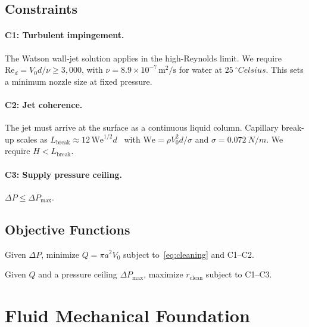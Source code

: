 \documentclass[10pt,letterpaper]{article}
\newcommand{\Rey}{\mathrm{Re}}
\newcommand{\We}{\mathrm{We}}
\begin{document}
\subsection{Constraints}

\paragraph{C1: Turbulent impingement.}
The Watson wall-jet solution applies in the high-Reynolds limit. We require
$\Rey_d = V_0 d/\nu \geq 3{,}000$, with $\nu = 8.9\times 10^{-7}\,\mathrm{m^2/s}$
for water at $25~^\circ Celsius$. This sets a minimum nozzle size at
fixed pressure.

\paragraph{C2: Jet coherence.}
The jet must arrive at the surface as a continuous liquid column. Capillary
break-up scales as $L_\mathrm{break} \approx 12\,\We^{1/2} d$~\citep{Lefebvre1988}
with $\We = \rho V_0^2 d/\sigma$ and $\sigma = 0.072~N/m$. We require
$H < L_\mathrm{break}$.

\paragraph{C3: Supply pressure ceiling.}
$\Delta P \leq \Delta P_\mathrm{max}$.

\subsection{Objective Functions}

\begin{description}[leftmargin=10pt]
\item[P1 (water minimization, fixed $\Delta P$):]
Given $\Delta P$, minimize $Q = \pi a^2 V_0$ subject to~\eqref{eq:cleaning}
and C1--C2.
\item[P2 (coverage maximization, fixed $Q$):]
Given $Q$ and a pressure ceiling $\Delta P_\mathrm{max}$, maximize
$r_\mathrm{clean}$ subject to C1--C3.
\end{description}

\section{Fluid Mechanical Foundation}
\label{sec:fluids}
\end{document}
